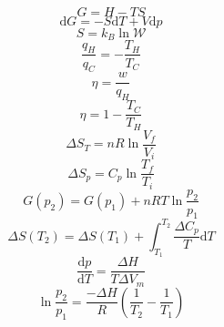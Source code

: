 \documentclass[12pt, letterpaper]{memoir}
\begin{document}
\vspace{-1em}
\noindent
\begin{minipage}{0.5\linewidth}
	\begin{equation*}
		G = H-TS
	\end{equation*}
	\begin{equation*}
		\mathrm{d}G=-S\mathrm{d}T+V\mathrm{d}p
	\end{equation*}
	\begin{equation*}
		S=k_B\ln \mathcal{W}
	\end{equation*}
	\begin{equation*}
		\dfrac{q_H}{q_C}=-\dfrac{T_H}{T_C}
	\end{equation*}
	\begin{equation*}
		\eta = \dfrac{w}{q_H}
	\end{equation*}
	\begin{equation*}
		\eta = 1 - \dfrac{T_C}{T_H}
	\end{equation*}
	\begin{equation*}
		\Delta S_T=nR\ln\dfrac{V_f}{V_i}
	\end{equation*}
	\begin{equation*}
		\Delta S_p=C_p\ln\dfrac{T_f}{T_i}
	\end{equation*}
	\begin{equation*}
		G(p_2) = G(p_1)+nRT\ln\dfrac{p_2}{p_1}
	\end{equation*}
	\begin{equation*}
		\Delta S(T_2) = \Delta S(T_1) + \int_{T_1}^{T_2} \! \dfrac{\Delta C_{p}}{T}\mathrm{d}T
	\end{equation*}
	\begin{equation*}
		\dfrac{\mathrm{d}p}{\mathrm{d}T}=\dfrac{\Delta H}{T\Delta V_m}
	\end{equation*}
	\begin{equation*}
		\ln\dfrac{p_2}{p_1}=\dfrac{-\Delta H}{R}\left(\dfrac{1}{T_2}-\dfrac{1}{T_1}\right)
	\end{equation*}
\end{minipage}
\end{document}
